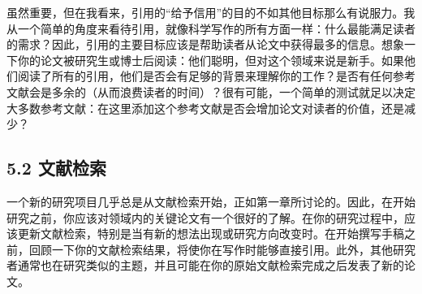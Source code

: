 虽然重要，但在我看来，引用的“给予信用”的目的不如其他目标那么有说服力。我从一个简单的角度来看待引用，就像科学写作的所有方面一样：什么最能满足读者的需求？因此，引用的主要目标应该是帮助读者从论文中获得最多的信息。想象一下你的论文被研究生或博士后阅读：他们聪明，但对这个领域来说是新手。如果他们阅读了所有的引用，他们是否会有足够的背景来理解你的工作？是否有任何参考文献会是多余的（从而浪费读者的时间）？很有可能，一个简单的测试就足以决定大多数参考文献：在这里添加这个参考文献是否会增加论文对读者的价值，还是减少？

\subsection*{5.2 文献检索}
一个新的研究项目几乎总是从文献检索开始，正如第一章所讨论的。因此，在开始研究之前，你应该对领域内的关键论文有一个很好的了解。在你的研究过程中，应该更新文献检索，特别是当有新的想法出现或研究方向改变时。在开始撰写手稿之前，回顾一下你的文献检索结果，将使你在写作时能够直接引用。此外，其他研究者通常也在研究类似的主题，并且可能在你的原始文献检索完成之后发表了新的论文。

